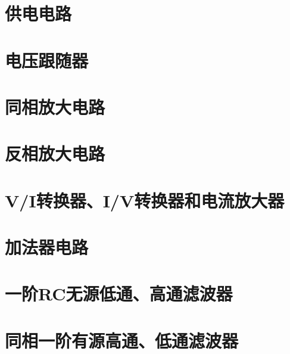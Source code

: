 \documentclass{ctexart}
\begin{document}
	
	\section{供电电路}
		
		
	\newpage
	\section{电压跟随器}
		
		
	\newpage
	\section{同相放大电路}
		

	\newpage
	\section{反相放大电路}
		
		
	\newpage
	\section{V/I转换器、I/V转换器和电流放大器}
		

	\newpage
	\section{加法器电路}
				
			
	\newpage
	\section{一阶RC无源低通、高通滤波器}
				

	\newpage
	\section{同相一阶有源高通、低通滤波器}
				
\end{document}
